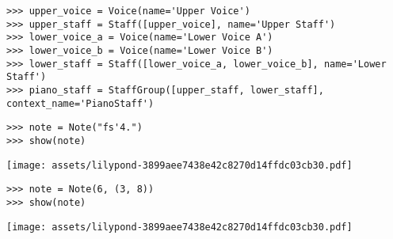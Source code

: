 \begin{comment}
<abjad>
upper_voice = Voice(name='Upper Voice')
upper_staff = Staff([upper_voice], name='Upper Staff')
lower_voice_a = Voice(name='Lower Voice A')
lower_voice_b = Voice(name='Lower Voice B')
lower_staff = Staff([lower_voice_a, lower_voice_b], name='Lower Staff')
piano_staff = StaffGroup([upper_staff, lower_staff], context_name='PianoStaff')
</abjad>
\end{comment}

\begin{abjadbookoutput}
\begin{singlespacing}
\vspace{-0.5\baselineskip}
\begin{lstlisting}
>>> upper_voice = Voice(name='Upper Voice')
>>> upper_staff = Staff([upper_voice], name='Upper Staff')
>>> lower_voice_a = Voice(name='Lower Voice A')
>>> lower_voice_b = Voice(name='Lower Voice B')
>>> lower_staff = Staff([lower_voice_a, lower_voice_b], name='Lower Staff')
>>> piano_staff = StaffGroup([upper_staff, lower_staff], context_name='PianoStaff')
\end{lstlisting}
\end{singlespacing}
\end{abjadbookoutput}

\begin{comment}
<abjad>
note = Note("fs'4.")
show(note)
</abjad>
\end{comment}

\begin{abjadbookoutput}
\begin{singlespacing}
\vspace{-0.5\baselineskip}
\begin{lstlisting}
>>> note = Note("fs'4.")
>>> show(note)
\end{lstlisting}
\noindent\texttt{[image: assets/lilypond-3899aee7438e42c8270d14ffdc03cb30.pdf]}
\end{singlespacing}
\end{abjadbookoutput}

\begin{comment}
<abjad>
note = Note(6, (3, 8))
show(note)
</abjad>
\end{comment}

\begin{abjadbookoutput}
\begin{singlespacing}
\vspace{-0.5\baselineskip}
\begin{lstlisting}
>>> note = Note(6, (3, 8))
>>> show(note)
\end{lstlisting}
\noindent\texttt{[image: assets/lilypond-3899aee7438e42c8270d14ffdc03cb30.pdf]}
\end{singlespacing}
\end{abjadbookoutput}

